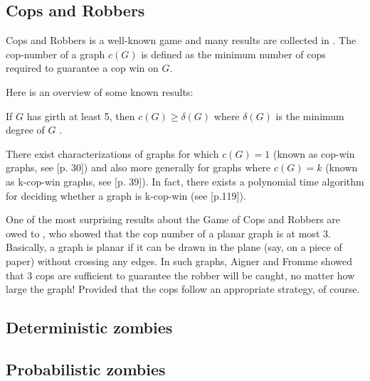 \subsection{Cops and Robbers}

Cops and Robbers is a well-known game and many results are collected in \cite{bonato2011game}. The cop-number of a graph $c(G)$ is defined as the minimum number of cops required to guarantee a cop win
on $G$.

Here is an overview of some known results:

If $G$ has girth at least 5, then $c(G)\geq \delta(G)$ where $\delta(G)$ is the minimum degree of $G$ \cite{aigner1984game}.


There exist characterizations of graphs for which $c(G) = 1$ (known as cop-win graphs, see
\cite{bonato2011game}[p. 30]) and
also more generally for graphs where $c(G) = k$ (known as k-cop-win graphs, see \cite{bonato2011game}[p. 39]).
In fact, there exists a polynomial time algorithm for deciding whether a graph is k-cop-win  (see \cite{bonato2011game}[p.119]).


One of the most surprising results about the Game of Cops and Robbers are owed to \cite{aigner1984game}, who showed that the cop number of a planar graph is at most 3.
Basically, a graph is planar if it can be drawn in the plane (say, on a piece of paper) without crossing any edges.
In such graphs, Aigner and Fromme showed that 3 cops are sufficient to guarantee the robber will be caught, no matter how large the graph!
Provided that the cops follow an appropriate strategy, of course.

\subsection{Deterministic zombies}


\subsection{Probabilistic zombies}
